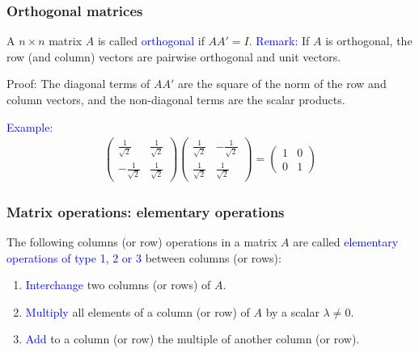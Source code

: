 \documentclass[11pt,aspectratio=169]{beamer}
\begin{document}
\begin{frame}
\frametitle{Orthogonal matrices}
\begin{small}
A $n \times n $ matrix $A$ is called \textcolor{blue}{orthogonal} if  $AA'=I$.
\vskip 12pt
\textcolor{blue}{Remark:} If $A$ is orthogonal, the row (and column) vectors are pairwise orthogonal and unit vectors.

\begin{tiny}Proof: The diagonal terms of $AA'$ are the square of the norm of the row and column vectors, and the non-diagonal  terms are the scalar products. \end{tiny}
\vskip 12pt
\textcolor{blue}{Example:}
\begin{align*}\begin{pmatrix}\frac{1}{\sqrt{2}}& \frac{1}{\sqrt{2}} \\
-\frac{1}{\sqrt{2}}& \frac{1}{\sqrt{2}}
\end{pmatrix} \begin{pmatrix}
\frac{1}{\sqrt{2}}& -\frac{1}{\sqrt{2}}\\
\frac{1}{\sqrt{2}}& \frac{1}{\sqrt{2}}
\end{pmatrix}=\begin{pmatrix}1&  0\\
0 & 1
\end{pmatrix}
\end{align*}


\end{small}
\end{frame}
\begin{frame}
\frametitle{Matrix operations: elementary operations}
\begin{small}
The following columns (or row) operations in a matrix $A$ are called \textcolor{blue}{elementary operations of type 1, 2 or 3} between columns (or rows):

\begin{enumerate}


\item \textcolor{blue}{Interchange} two columns (or rows) of $A$.

\item \textcolor{blue}{Multiply} all elements of a column (or row) of $A$ by a scalar $\lambda \neq 0$.

\item \textcolor{blue}{Add} to a column (or row) the multiple of another column (or row).

\end{enumerate}

\end{small}
\end{frame}
\end{document}
